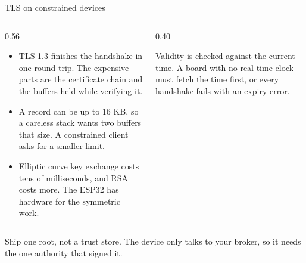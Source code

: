 \documentclass[10pt,aspectratio=169,t]{beamer}
\begin{document}
\begin{frame}[embedded,eyebrow=Trust]{TLS on constrained devices}
  \begin{columns}[T]
    \begin{column}{0.56\textwidth}
      \begin{itemize}
        \item TLS 1.3 finishes the handshake in one round trip. The expensive parts are the certificate chain and the buffers held while verifying it.
        \item A record can be up to 16 KB, so a careless stack wants two buffers that size. A constrained client asks for a smaller limit.
        \item Elliptic curve key exchange costs tens of milliseconds, and RSA costs more. The ESP32 has hardware for the symmetric work.
      \end{itemize}
    \end{column}
    \begin{column}{0.40\textwidth}
      \begin{hint}
        Validity is checked against the current time. A board with no real-time clock must fetch the time first, or every handshake fails with an expiry error.
      \end{hint}
    \end{column}
  \end{columns}
  \begin{takeaway}{Ship one root, not a trust store.}
    The device only talks to your broker, so it needs the one authority that signed it.
  \end{takeaway}
\end{frame}
\end{document}
